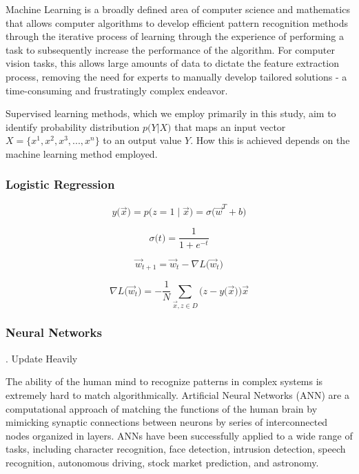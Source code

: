 \documentclass[%
 aip,
 jmp,%
 amsmath,amssymb,
 reprint,%
]{revtex4-1}
\begin{document}
Machine Learning is a broadly defined area of computer science and mathematics that allows computer algorithms to develop efficient pattern recognition methods through the iterative process of learning through the experience of performing a task to subsequently increase the performance of the algorithm. For computer vision tasks, this allows large amounts of data to dictate the feature extraction process, removing the need for experts to manually develop tailored solutions - a time-consuming and frustratingly complex endeavor. 

Supervised learning methods, which we employ primarily in this study, aim to identify probability distribution \(p \big(Y |  X \big)\) that maps an input vector \(X = \big\{x^1, x^2, x^3, ..., x^n\big\}\) to an output value \(Y\). How this is achieved depends on the machine learning method employed. 

\subsubsection{\label{sec:level3}Logistic Regression}

$$
y \big( \overrightarrow{x} \big) = p \big(z=1 \mid  \overrightarrow{x} \big) =  \sigma  \big( \overrightarrow{w}^{T}+b \big) 
$$

$$
 \sigma  \big(t\big) = \frac{1}{1+e^{-t}}
$$ 

$$
\overrightarrow{w}_{t+1} = \overrightarrow{w}_{t} -  \nabla L \big(\overrightarrow{w}_{t}\big) 
$$
 
$$
\nabla L \big(\overrightarrow{w}_{t}\big) =  -\frac{1}{N}  \sum_{ \overrightarrow{x}, z \in D } \big(z-y \big( \overrightarrow{x} \big) \big)\overrightarrow{x}

$$

\subsubsection{\label{sec:level3}Neural Networks}

. Update Heavily 

The ability of the human mind to recognize patterns in complex systems is extremely hard to match algorithmically. Artificial Neural Networks (ANN) are a computational approach of matching the functions of the human brain by mimicking synaptic connections between neurons by series of interconnected nodes organized in layers. ANNs have been successfully applied to a wide range of tasks, including character recognition, face detection, intrusion detection, speech recognition, autonomous driving, stock market prediction, and astronomy. 
\end{document}
